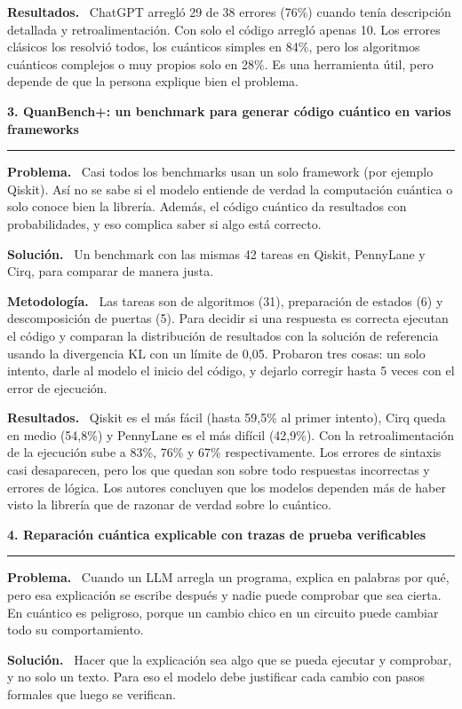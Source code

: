\documentclass[11pt,a4paper]{article}
\newcommand{\paper}[1]{\vspace{1.2em}\par{\large\textbf{#1}}\par\vspace{0.2em}\hrule\vspace{0.4em}}
\newcommand{\parte}[1]{\par\textbf{#1.}\ }
\begin{document}
\parte{Resultados}
ChatGPT arregló 29 de 38 errores (76\%) cuando tenía descripción detallada y retroalimentación. Con solo el código arregló apenas 10. Los errores clásicos los resolvió todos, los cuánticos simples en 84\%, pero los algoritmos cuánticos complejos o muy propios solo en 28\%. Es una herramienta útil, pero depende de que la persona explique bien el problema.

\paper{3. QuanBench+: un benchmark para generar código cuántico en varios frameworks}

\parte{Problema}
Casi todos los benchmarks usan un solo framework (por ejemplo Qiskit). Así no se sabe si el modelo entiende de verdad la computación cuántica o solo conoce bien la librería. Además, el código cuántico da resultados con probabilidades, y eso complica saber si algo está correcto.

\parte{Solución}
Un benchmark con las mismas 42 tareas en Qiskit, PennyLane y Cirq, para comparar de manera justa.

\parte{Metodología}
Las tareas son de algoritmos (31), preparación de estados (6) y descomposición de puertas (5). Para decidir si una respuesta es correcta ejecutan el código y comparan la distribución de resultados con la solución de referencia usando la divergencia KL con un límite de 0,05. Probaron tres cosas: un solo intento, darle al modelo el inicio del código, y dejarlo corregir hasta 5 veces con el error de ejecución.

\parte{Resultados}
Qiskit es el más fácil (hasta 59,5\% al primer intento), Cirq queda en medio (54,8\%) y PennyLane es el más difícil (42,9\%). Con la retroalimentación de la ejecución sube a 83\%, 76\% y 67\% respectivamente. Los errores de sintaxis casi desaparecen, pero los que quedan son sobre todo respuestas incorrectas y errores de lógica. Los autores concluyen que los modelos dependen más de haber visto la librería que de razonar de verdad sobre lo cuántico.

\paper{4. Reparación cuántica explicable con trazas de prueba verificables}

\parte{Problema}
Cuando un LLM arregla un programa, explica en palabras por qué, pero esa explicación se escribe después y nadie puede comprobar que sea cierta. En cuántico es peligroso, porque un cambio chico en un circuito puede cambiar todo su comportamiento.

\parte{Solución}
Hacer que la explicación sea algo que se pueda ejecutar y comprobar, y no solo un texto. Para eso el modelo debe justificar cada cambio con pasos formales que luego se verifican.
\end{document}
